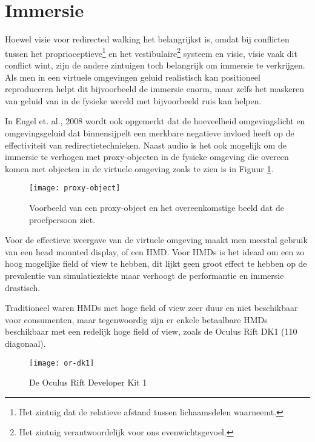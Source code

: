\section{Immersie}
Hoewel visie voor redirected walking het belangrijkst is, omdat bij conflicten
tussen het proprioceptieve\footnote{Het zintuig dat de relatieve afstand tussen
lichaamsdelen waarneemt.} en het vestibulaire\footnote{Het zintuig 
verantwoordelijk voor ons evenwichtsgevoel.} systeem en visie, visie vaak dit
conflict wint\cite{berthoz02,dichgans78,bruder08}, zijn de andere zintuigen toch
belangrijk om immersie te verkrijgen. Als men in een virtuele omgevingen geluid 
realistisch kan positioneel reproduceren helpt dit bijvoorbeeld de immersie 
enorm\cite{lackner77}, maar zelfs het maskeren van geluid van in de fysieke 
wereld met bijvoorbeeld ruis kan helpen\cite{usoh99}.

In Engel et. al., 2008\cite{engel08} wordt ook opgemerkt dat de hoeveelheid 
omgevingslicht en omgevingsgeluid dat binnensijpelt een merkbare negatieve 
invloed heeft op de effectiviteit van redirectietechnieken. Naast audio is het 
ook mogelijk om de immersie te verhogen met proxy-objecten in de fysieke 
omgeving die overeen komen met objecten in de virtuele omgeving\cite{steinicke09}
zoals te zien is in Figuur \ref{fig:proxy-object}.

\begin{figure}[h!]
    \centering
    \texttt{[image: proxy-object]}
    \caption{Voorbeeld van een proxy-object en het overeenkomstige beeld dat de
    proefpersoon ziet.\cite{steinicke09}}
    \label{fig:proxy-object}
\end{figure}

Voor de effectieve weergave van de virtuele omgeving maakt men meestal gebruik 
van een head mounted display, of een HMD. Voor HMDs is het ideaal om een zo hoog 
mogelijke field of view te hebben, dit lijkt geen groot effect te hebben op de 
prevalentie van simulatieziekte\cite{arthur00} maar verhoogt de performantie en 
immersie drastisch\cite{arthur00}.

Traditioneel waren HMDs met hoge field of view zeer duur en niet beschikbaar voor
consumenten, maar tegenwoordig zijn er enkele betaalbare HMDs beschikbaar met een
redelijk hoge field of view, zoals de Oculus Rift DK1 (110\textdegree{} 
diagonaal).

\begin{figure}[h!]
    \centering
    \texttt{[image: or-dk1]}
    \caption{De Oculus Rift Developer Kit 1}
    \label{fig:or-dk1}
\end{figure}

